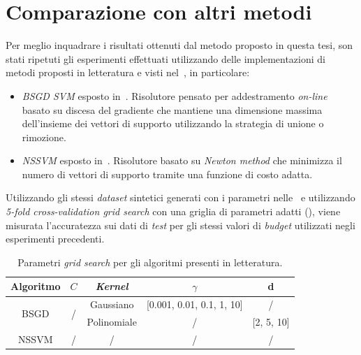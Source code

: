 \section{Comparazione con altri metodi}\label{sec:comparazione_metodi}
Per meglio inquadrare i risultati ottenuti dal metodo proposto in questa tesi, son stati ripetuti gli esperimenti effettuati utilizzando delle implementazioni di metodi proposti in letteratura e visti nel~, in particolare:
\begin{itemize}
    \item \emph{BSGD SVM} esposto in~\cite{2012_bsgd}. Risolutore pensato per addestramento \emph{on-line} basato su discesa del gradiente che mantiene una dimensione massima dell'insieme dei vettori di supporto utilizzando la strategia di unione o rimozione.
    \item \emph{NSSVM} esposto in~\cite{2020_sparse_svm}. Risolutore basato su \emph{Newton method} che minimizza il numero di vettori di supporto tramite una funzione di costo adatta.
\end{itemize}
Utilizzando gli stessi \emph{dataset} sintetici generati con i parametri nelle~ e utilizzando \emph{5-fold cross-validation grid search} con una griglia di parametri adatti (), viene misurata l'accuratezza sui dati di \emph{test} per gli stessi valori di \emph{budget} utilizzati negli esperimenti precedenti.
\begin{table}
    \centering
    \begin{tabular}{ccccc}
        \toprule
        Algoritmo & $C$ & \emph{Kernel} & $\gamma$ & d \\
        \midrule
        \multirow{2}{*}{BSGD}   & \multirow{2}{*}{/}  & Gaussiano   & [0.001, 0.01, 0.1, 1, 10]   & /\\
                                      \cline{3-5}
                                &   & Polinomiale & / & [2, 5, 10] \\
        \hline
        NSSVM   & / & / & / & / \\
        \bottomrule
    \end{tabular}
    \caption{Parametri \emph{grid search} per gli algoritmi presenti in letteratura.}
    \label{tab:gridsearch_comparazioni}
\end{table}

